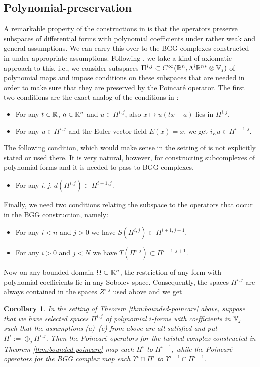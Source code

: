 \documentclass[11pt]{amsart}
\newtheorem{corollary}{Corollary}
\newcommand{\0}{\mathaccent23}
\begin{document}
\subsection{Polynomial-preservation}\label{sec:Polynomial-preservation}
A remarkable property of the constructions in \cite{costabel2010bogovskiui} is that the operators preserve subspaces of differential forms with polynomial coefficients under rather weak and general assumptions. We can carry this over to the BGG complexes constructed in \cite{vcap2022bgg} under appropriate assumptions. Following \cite{costabel2010bogovskiui}, we take a kind of axiomatic approach to this, i.e., we consider subspaces {$\Pi^{i,j}\subset C^\infty(\Bbb R^n,\Lambda^i\Bbb R^{n*}\otimes\Bbb V_j)$ of polynomial maps} and impose conditions on these subspaces that are needed in order to make sure that they are preserved by the Poincar\'e operator. The first two conditions are the exact analog of the conditions in  \cite{costabel2010bogovskiui}:
\begin{itemize}
\item[(a)] For any $t\in\Bbb R$, $a\in\Bbb R^n$ and $u\in\Pi^{i,j}$, also $x\mapsto u(tx+a)$ lies in $\Pi^{i,j}$.
  \item[(b)] For any $u\in\Pi^{i,j}$ and the Euler vector field $E(x)=x$, we get $i_Eu\in \Pi^{i-1,j}$.   
\end{itemize}
The following condition, which would make sense in the setting of \cite{costabel2010bogovskiui} is not explicitly stated or used there. It is very natural, however, for constructing subcomplexes of polynomial forms and it is needed to pass to BGG complexes. 
\begin{itemize}
\item[(c)] For any {$i, j$}, $d(\Pi^{i,j})\subset \Pi^{i+1,j}$.  
\end{itemize}
Finally, we need two conditions relating the subspace to the operators that occur in the BGG construction, namely: 
\begin{itemize}
\item[(d)] For any $i<n$ and $j>0$ we have $S(\Pi^{i,j})\subset \Pi^{i+1,j-1}$.
\item[(e)] For any $i>0$ and $j<N$ we have $T(\Pi^{i,j})\subset \Pi^{i-1,j+1}$.   
\end{itemize}
Now on any bounded domain $\Omega\subset\Bbb R^n$, the restriction of any form with polynomial coefficients lie in any Sobolev space. Consequently,  the spaces $\Pi^{i,j}$ are always contained in the spaces $Z^{i,j}$ used above  and we get
\begin{corollary}\label{cor:polynomial}
 In the setting of Theorem \ref{thm:bounded-poincare} above, suppose that we have selected spaces $\Pi^{i,j}$ of polynomial $i$-forms with coefficients in $\Bbb V_j$ such that the assumptions (a)--(e) from above are all satisfied and put $\Pi^i:=\oplus_j \Pi^{i,j}$. Then the Poincar\'e operators for the twisted complex constructed in Theorem \ref{thm:bounded-poincare} map each $\Pi^i$ to $\Pi^{i-1}$, while the Poincar\'e operators for the BGG complex map each $\Upsilon^i\cap \Pi^i$ to $\Upsilon^{i-1}\cap \Pi^{i-1}$. 
\end{corollary}
\end{document}
